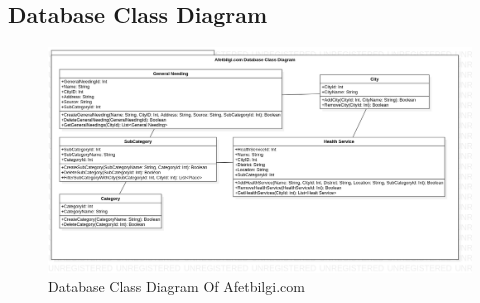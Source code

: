 \subsection{Database Class Diagram}
\begin{figure}[H]
    \includegraphics[scale = 0.4]{assets/DatabaseClassDiagram1.png}
    \caption[Database Class Diagram Of Afetbilgi.com]{Database Class Diagram Of Afetbilgi.com}
\end{figure}

